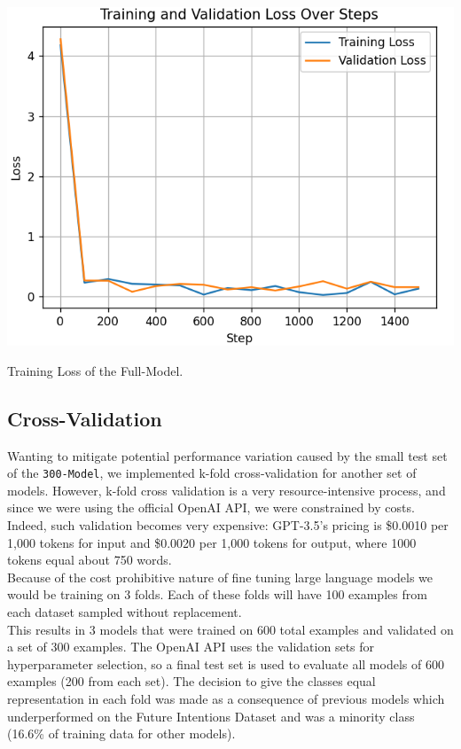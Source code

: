 \documentclass[10pt,twocolumn,letterpaper]{article}
\begin{document}
\begin{center}
    \includegraphics*[scale=0.55]{img/training_loss_full.png} 
\end{center}

\begin{center}
    \small {Training Loss of the Full-Model.} 
\end{center}

\subsection{Cross-Validation}

Wanting to mitigate potential performance variation caused by the small test set of the \texttt{300-Model}, 
we implemented k-fold cross-validation for another set of models.
However, k-fold cross validation is a very resource-intensive process, and since we were using the official OpenAI API,
we were constrained by costs. Indeed, such validation becomes very expensive: GPT-3.5's pricing is \$0.0010 per 1,000 tokens 
for input and \$0.0020 per 1,000 tokens for output, where 1000 tokens equal about 750 words. \\

Because of the cost prohibitive nature of fine tuning large language models we would be training on 3 folds. 
Each of these folds will have 100 examples from each dataset sampled without replacement. \\

This results in 3 models that were trained on 600 total examples and validated on a set of 300 examples. 
The OpenAI API uses the validation sets for hyperparameter selection, so a final test set is used to evaluate all models 
of 600 examples (200 from each set). The decision to give the classes equal representation in each fold was made as 
a consequence of previous models which underperformed on the Future Intentions Dataset and was
a minority class (16.6\% of training data for other models).
\end{document}
